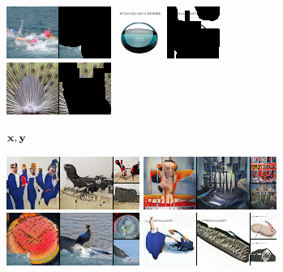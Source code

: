 \begin{figure}[t]
\begin{subfigure}[t]{0.15\textwidth}
      \includegraphics[height=\imagenetimgheight]{figs/cigcvae/image-samples/imagenet64/freeform_aipo_2_gt_masked.png}
      \includegraphics[height=\imagenetimgheight]{figs/cigcvae/image-samples/imagenet64/freeform_aipo_3_gt_masked.png}
      \includegraphics[height=\imagenetimgheight]{figs/cigcvae/image-samples/imagenet64/freeform_aipo_4_gt_masked.png}
      \caption*{${\mathbf{x}}, {\mathbf{y}}$}
    \end{subfigure}
    \begin{subfigure}[t]{0.2\textwidth}
      \centering
      \includegraphics[height=\imagenetimgheight]{figs/cigcvae/image-samples/imagenet64/freeform_co_mod_gan_0_samples.png}
      \includegraphics[height=\imagenetimgheight]{figs/cigcvae/image-samples/imagenet64/freeform_co_mod_gan_1_samples.png}
      \includegraphics[height=\imagenetimgheight]{figs/cigcvae/image-samples/imagenet64/freeform_co_mod_gan_2_samples.png}
      \includegraphics[height=\imagenetimgheight]{figs/cigcvae/image-samples/imagenet64/freeform_co_mod_gan_3_samples.png}

\end{subfigure}
\end{figure}

